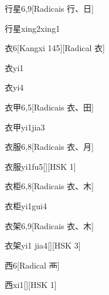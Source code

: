 \begin{entry}{行星}{6,9}[Radicais ⾏、⽇]
  \begin{phonetics}{行星}{xing2xing1}
  \end{phonetics}
\end{entry}

\begin{entry}{衣}{6}[Kangxi 145][Radical ⾐]
  \begin{phonetics}{衣}{yi1}
  \end{phonetics}
  \begin{phonetics}{衣}{yi4}
  \end{phonetics}
\end{entry}

\begin{entry}{衣甲}{6,5}[Radicais ⾐、⽥]
  \begin{phonetics}{衣甲}{yi1jia3}
  \end{phonetics}
\end{entry}

\begin{entry}{衣服}{6,8}[Radicais ⾐、⽉]
  \begin{phonetics}{衣服}{yi1fu5}[][HSK 1]
  \end{phonetics}
\end{entry}

\begin{entry}{衣柜}{6,8}[Radicais ⾐、⽊]
  \begin{phonetics}{衣柜}{yi1gui4}
  \end{phonetics}
\end{entry}

\begin{entry}{衣架}{6,9}[Radicais ⾐、⽊]
  \begin{phonetics}{衣架}{yi1 jia4}[][HSK 3]
  \end{phonetics}
\end{entry}

\begin{entry}{西}{6}[Radical ⾑]
  \begin{phonetics}{西}{xi1}[][HSK 1]
  \end{phonetics}
\end{entry}

